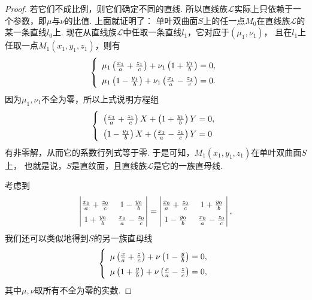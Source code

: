 \begin{theorem}
\begin{proof}
若它们不成比例，则它们确定不同的直线.
所以直线族\(\mathcal{L}\)实际上只依赖于一个参数，即\(\mu\)与\(\nu\)的比值.
上面就证明了：
单叶双曲面\(S\)上的任一点\(M_0\)在直线族\(\mathcal{L}\)的某一条直线\(l_0\)上.
现在从直线族\(\mathcal{L}\)中任取一条直线\(l_1\)，它对应于\((\mu_1,\nu_1)\)，
且在\(l_1\)上任取一点\(M_1(x_1,y_1,z_1)\)，则有\[
	\left\{ \def\arraystretch{1.5} \begin{array}{l}
		\mu_1 \left(\frac{x_1}{a}+\frac{z_1}{c}\right)
		+ \nu_1 \left(1+\frac{y_1}{b}\right) = 0, \\
		\mu_1 \left(1-\frac{y_1}{b}\right)
		+ \nu_1 \left(\frac{x_1}{a}-\frac{z_1}{c}\right) = 0.
	\end{array} \right.
\]
因为\(\mu_1,\nu_1\)不全为零，所以上式说明方程组\[
	\left\{ \def\arraystretch{1.5} \begin{array}{l}
		\left(\frac{x_1}{a}+\frac{z_1}{c}\right) X
		+ \left(1+\frac{y_1}{b}\right) Y = 0, \\
		\left(1-\frac{y_1}{b}\right) X
		+ \left(\frac{x_1}{a}-\frac{z_1}{c}\right) Y = 0
	\end{array} \right.
\]有非零解，从而它的系数行列式等于零.
于是可知，\(M_1(x_1,y_1,z_1)\)在单叶双曲面\(S\)上，
也就是说，\(S\)是直纹面，且直线族\(\mathcal{L}\)是它的一族直母线.

考虑到\[
	\def\arraystretch{1.5}
	\begin{vmatrix}
		\frac{x_0}{a}+\frac{z_0}{c} & 1-\frac{y_0}{b} \\
		1+\frac{y_0}{b} & \frac{x_0}{a}-\frac{z_0}{c}
	\end{vmatrix}
	= \begin{vmatrix}
		\frac{x_0}{a}+\frac{z_0}{c} & 1+\frac{y_0}{b} \\
		1-\frac{y_0}{b} & \frac{x_0}{a}-\frac{z_0}{c}
	\end{vmatrix},
\]
我们还可以类似地得到\(S\)的另一族直母线\[
	\left\{ \def\arraystretch{1.5} \begin{array}{l}
		\mu \left(\frac{x}{a}+\frac{z}{c}\right)
		+ \nu \left(1-\frac{y}{b}\right) = 0, \\
		\mu \left(1+\frac{y}{b}\right)
		+ \nu \left(\frac{x}{a}-\frac{z}{c}\right) = 0,
	\end{array} \right.
\]
其中\(\mu,\nu\)取所有不全为零的实数.
\end{proof}
\end{theorem}

